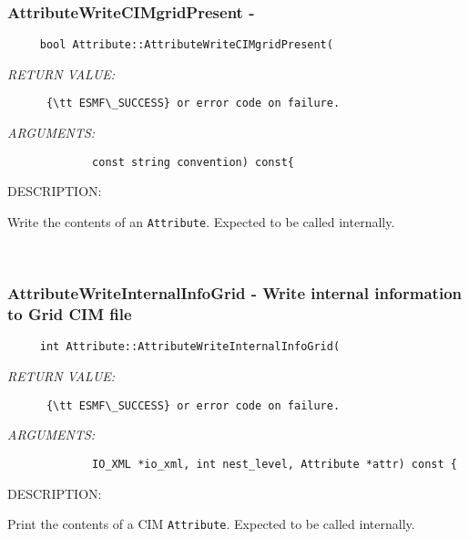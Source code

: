 \subsubsection [AttributeWriteCIMgridPresent] {AttributeWriteCIMgridPresent -}


  
\begin{verbatim}     bool Attribute::AttributeWriteCIMgridPresent(\end{verbatim}{\em RETURN VALUE:}
\begin{verbatim}      {\tt ESMF\_SUCCESS} or error code on failure.\end{verbatim}{\em ARGUMENTS:}
\begin{verbatim}             const string convention) const{\end{verbatim}
{\sf DESCRIPTION:\\ }


      Write the contents of an {\tt Attribute}.  Expected to be
      called internally.
   
 
\mbox{}\hrulefill\
 
\subsubsection [AttributeWriteInternalInfoGrid] {AttributeWriteInternalInfoGrid - Write internal information to Grid CIM file}


  
\begin{verbatim}     int Attribute::AttributeWriteInternalInfoGrid(\end{verbatim}{\em RETURN VALUE:}
\begin{verbatim}      {\tt ESMF\_SUCCESS} or error code on failure.\end{verbatim}{\em ARGUMENTS:}
\begin{verbatim}             IO_XML *io_xml, int nest_level, Attribute *attr) const {\end{verbatim}
{\sf DESCRIPTION:\\ }


      Print the contents of a CIM {\tt Attribute}.  Expected to be
      called internally.
   
 
\mbox{}\hrulefill\
 

